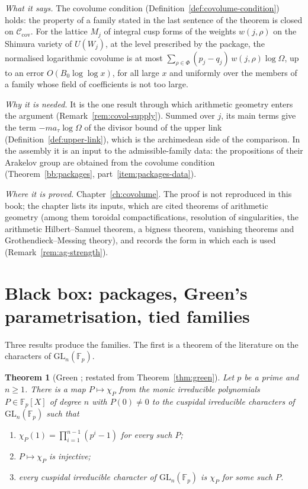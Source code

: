\documentclass[11pt]{amsbook}
\theoremstyle{plain}
\newtheorem{theorem}{Theorem}[section]
\theoremstyle{definition}
\theoremstyle{remark}
\numberwithin{equation}{section}
\numberwithin{figure}{chapter}
\numberwithin{table}{chapter}
\newcommand{\F}{\mathbb{F}}
\begin{document}
\noindent\emph{What it says.} The covolume condition
(Definition~\ref{def:covolume-condition}) holds: the property of a
family stated in the last sentence of the theorem is closed on
$\mathcal C_{\mathrm{cov}}$. For the lattice $M_j$ of integral cusp
forms of the weights $w(j,\rho)$ on the Shimura variety of $U(W_j)$,
at the level prescribed by the package, the normalised logarithmic
covolume is at most $\sum_{\rho\in\Phi}(p_j-q_j)\,w(j,\rho)
\log\Omega$, up to an error $O(B_0\log\log x)$, for all large $x$ and
uniformly over the members of a family whose field of coefficients is
not too large.

\noindent\emph{Why it is needed.} It is the one result through which
arithmetic geometry enters the argument
(Remark~\ref{rem:covol-supply}). Summed over $j$, its main terms give
the term $-ma_\tau\log\Omega$ of the divisor bound of the upper link
(Definition~\ref{def:upper-link}), which is the archimedean side of
the comparison. In the assembly it is an input to the
admissible-family data: the propositions of their Arakelov group are
obtained from the covolume condition
(Theorem~\ref{bb:packages}, part~\ref{item:packages-data}).

\noindent\emph{Where it is proved.} Chapter~\ref{ch:covolume}. The
proof is not reproduced in this book; the chapter lists its inputs,
which are cited theorems of arithmetic geometry (among them toroidal
compactifications, resolution of singularities, the arithmetic
Hilbert--Samuel theorem, a bigness theorem, vanishing theorems and
Grothendieck--Messing theory), and records the form in which each is
used (Remark~\ref{rem:ag-strength}).

\section{Black box: packages, Green's parametrisation, tied families}
\label{sec:bb-families}

Three results produce the families. The first is a theorem of the
literature on the characters of $\mathrm{GL}_n(\F_p)$.

\begin{theorem}[Green \cite{Green1955}; restated from
Theorem~\ref{thm:green}]
\label{bb:green}
Let $p$ be a prime and $n\ge1$. There is a map $P\mapsto\chi_P$ from
the monic irreducible polynomials $P\in\F_p[X]$ of degree $n$ with
$P(0)\ne0$ to the cuspidal irreducible characters of
$\mathrm{GL}_n(\F_p)$ such that
\begin{enumerate}[label=(\alph*)]
\item $\chi_P(1)=\prod_{i=1}^{n-1}(p^i-1)$ for every such $P$;
\item $P\mapsto\chi_P$ is injective;
\item every cuspidal irreducible character of $\mathrm{GL}_n(\F_p)$ is
$\chi_P$ for some such $P$.
\end{enumerate}
\end{theorem}
\end{document}

